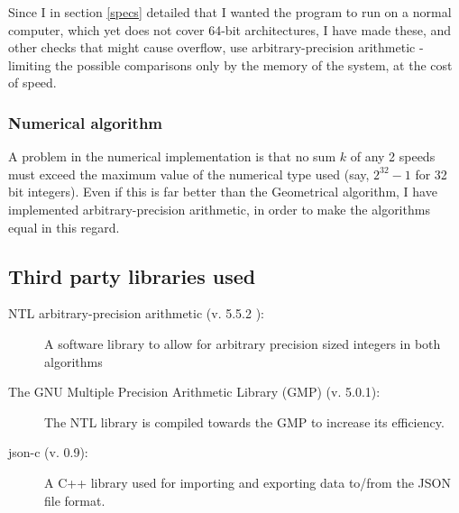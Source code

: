 Since I in section \ref{specs} detailed that I wanted the program to run on a normal computer, which yet does not cover 64-bit architectures, I have made these, and other checks that might cause overflow, use arbitrary-precision arithmetic - limiting the possible comparisons only by the memory of the system, at the cost of speed.

\subsubsection{Numerical algorithm}
A problem in the numerical implementation is that no sum $k$ of any 2 speeds must exceed the maximum value of the numerical type used (say, $2^{32} - 1$ for 32 bit integers). Even if this is far better than the Geometrical algorithm, I have implemented arbitrary-precision arithmetic, in order to make the algorithms equal in this regard.

\subsection{Third party libraries used}
\begin{description}
\item[NTL arbitrary-precision arithmetic (v. 5.5.2 ):] A software library to allow for arbitrary precision sized integers in both algorithms
\item[The GNU Multiple Precision Arithmetic Library (GMP) (v. 5.0.1):] The NTL library is compiled towards the GMP to increase its efficiency. 
\item[json-c (v. 0.9):] A C++ library used for importing and exporting data to/from the JSON file format.
\end{description}
